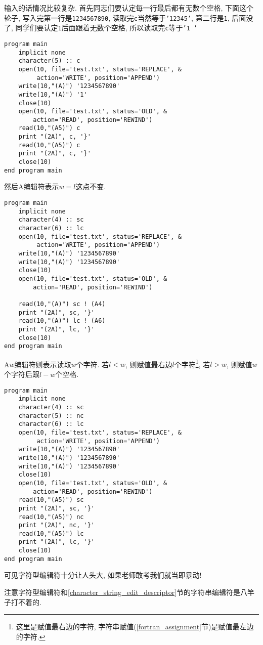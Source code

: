 输入的话情况比较复杂. 首先同志们要认定每一行最后都有无数个空格, 下面这个轮子, 写入完第一行是\texttt{1234567890}, 读取完\texttt{c}当然等于\texttt{'12345'}, 第二行是\texttt{1}, 后面没了, 同学们要认定\texttt{1}后面跟着无数个空格, 所以读取完\texttt{c}等于\texttt{'1    '}
\begin{lstlisting}
program main
    implicit none
    character(5) :: c
    open(10, file='test.txt', status='REPLACE', &
         action='WRITE', position='APPEND')
    write(10,"(A)") '1234567890'
    write(10,"(A)") '1'
    close(10)
    open(10, file='test.txt', status='OLD', &
        action='READ', position='REWIND')
    read(10,"(A5)") c
    print "(2A)", c, '}'
    read(10,"(A5)") c
    print "(2A)", c, '}'
    close(10)
end program main
\end{lstlisting}
然后A编辑符表示$w=l$这点不变.
\begin{lstlisting}
program main
    implicit none
    character(4) :: sc
    character(6) :: lc
    open(10, file='test.txt', status='REPLACE', &
         action='WRITE', position='APPEND')
    write(10,"(A)") '1234567890'
    write(10,"(A)") '1234567890'
    close(10)
    open(10, file='test.txt', status='OLD', &
        action='READ', position='REWIND')

    read(10,"(A)") sc ! (A4)
    print "(2A)", sc, '}'
    read(10,"(A)") lc ! (A6)
    print "(2A)", lc, '}'
    close(10)
end program main
\end{lstlisting}
A$w$编辑符则表示读取$w$个字符. 若$l<w$, 则赋值最右边$l$个字符\footnote{这里是赋值最右边的字符, 字符串赋值(\ref{fortran_assignment}节)是赋值最左边的字符.}, 若$l>w$, 则赋值$w$个字符后跟$l-w$个空格.
\begin{lstlisting}
program main
    implicit none
    character(4) :: sc
    character(5) :: nc
    character(6) :: lc
    open(10, file='test.txt', status='REPLACE', &
         action='WRITE', position='APPEND')
    write(10,"(A)") '1234567890'
    write(10,"(A)") '1234567890'
    write(10,"(A)") '1234567890'
    close(10)
    open(10, file='test.txt', status='OLD', &
        action='READ', position='REWIND')
    read(10,"(A5)") sc
    print "(2A)", sc, '}'
    read(10,"(A5)") nc
    print "(2A)", nc, '}'
    read(10,"(A5)") lc
    print "(2A)", lc, '}'
    close(10)
end program main
\end{lstlisting}

可见字符型编辑符十分让人头大, 如果老师敢考我们就当即暴动!

注意字符型编辑符和\ref{character_string_edit_descriptor}节的字符串编辑符是八竿子打不着的.

